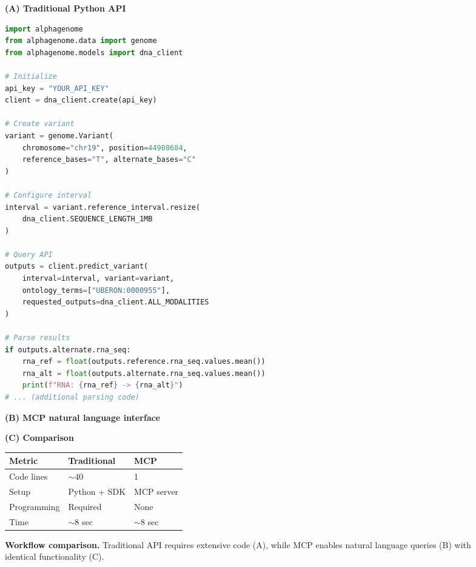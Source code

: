 \documentclass[11pt]{article}
\begin{document}
\begin{figure}[t]
\centering

\noindent\textbf{(A) Traditional Python API}

\begin{lstlisting}[language=Python]
import alphagenome
from alphagenome.data import genome
from alphagenome.models import dna_client

# Initialize
api_key = "YOUR_API_KEY"
client = dna_client.create(api_key)

# Create variant
variant = genome.Variant(
    chromosome="chr19", position=44908684,
    reference_bases="T", alternate_bases="C"
)

# Configure interval
interval = variant.reference_interval.resize(
    dna_client.SEQUENCE_LENGTH_1MB
)

# Query API
outputs = client.predict_variant(
    interval=interval, variant=variant,
    ontology_terms=["UBERON:0000955"],
    requested_outputs=dna_client.ALL_MODALITIES
)

# Parse results
if outputs.alternate.rna_seq:
    rna_ref = float(outputs.reference.rna_seq.values.mean())
    rna_alt = float(outputs.alternate.rna_seq.values.mean())
    print(f"RNA: {rna_ref} -> {rna_alt}")
# ... (additional parsing code)
\end{lstlisting}

\vspace{0.8cm}

\noindent\textbf{(B) MCP natural language interface}

\vspace{0.4cm}


\vspace{0.8cm}

\noindent\textbf{(C) Comparison}

\vspace{0.3cm}

\begin{tabular}{lll}
\toprule
\textbf{Metric} & \textbf{Traditional} & \textbf{MCP} \\
\midrule
Code lines & $\sim$40 & 1 \\
Setup & Python + SDK & MCP server \\
Programming & Required & None \\
Time & $\sim$8 sec & $\sim$8 sec \\
\bottomrule
\end{tabular}

\caption{\textbf{Workflow comparison.} Traditional API requires extensive code (A), while MCP enables natural language queries (B) with identical functionality (C).}
\label{fig:comparison}
\end{figure}
\end{document}
